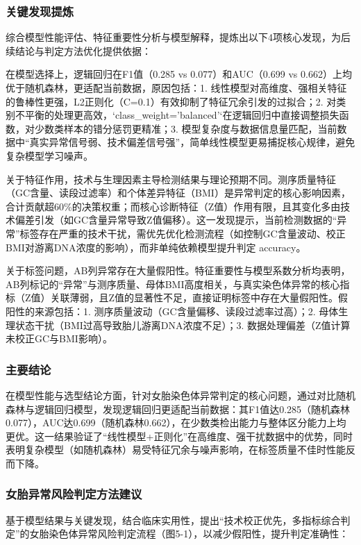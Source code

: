 \documentclass[withoutpreface,bwprint]{cumcmthesis} %
\begin{document}
\subsubsection{关键发现提炼}
综合模型性能评估、特征重要性分析与模型解释，提炼出以下4项核心发现，为后续结论与判定方法优化提供依据：

在模型选择上，逻辑回归在F1值（0.285 vs 0.077）和AUC（0.699 vs 0.662）上均优于随机森林，更适配当前数据，原因包括：1. 线性模型对高维度、强相关特征的鲁棒性更强，L2正则化（C=0.1）有效抑制了特征冗余引发的过拟合；2. 对类别不平衡的处理更高效，`class\_weight='balanced'`在逻辑回归中直接调整损失函数，对少数类样本的错分惩罚更精准；3. 模型复杂度与数据信息量匹配，当前数据中“真实异常信号弱、技术偏差信号强”，简单线性模型更易捕捉核心规律，避免复杂模型学习噪声。

关于特征作用，技术与生理因素主导检测结果与理论预期不同。测序质量特征（GC含量、读段过滤率）和个体差异特征（BMI）是异常判定的核心影响因素，合计贡献超60\%的决策权重；而核心诊断特征（Z值）作用有限，且其变化多由技术偏差引发（如GC含量异常导致Z值偏移）。这一发现提示，当前检测数据的“异常”标签存在严重的技术干扰，需优先优化检测流程（如控制GC含量波动、校正BMI对游离DNA浓度的影响），而非单纯依赖模型提升判定 accuracy。

关于标签问题，AB列异常存在大量假阳性。特征重要性与模型系数分析均表明，AB列标记的“异常”与测序质量、母体BMI高度相关，与真实染色体异常的核心指标（Z值）关联薄弱，且Z值的显著性不足，直接证明标签中存在大量假阳性。假阳性的来源包括：1. 测序质量波动（GC含量偏移、读段过滤率过高）；2. 母体生理状态干扰（BMI过高导致胎儿游离DNA浓度不足）；3. 数据处理偏差（Z值计算未校正GC与BMI影响）。

\subsubsection{主要结论}
在模型性能与选型结论方面，针对女胎染色体异常判定的核心问题，通过对比随机森林与逻辑回归模型，发现逻辑回归更适配当前数据：其F1值达0.285（随机森林0.077），AUC达0.699（随机森林0.662），在少数类检出能力与整体区分能力上均更优。这一结果验证了“线性模型+正则化”在高维度、强干扰数据中的优势，同时表明复杂模型（如随机森林）易受特征冗余与噪声影响，在标签质量不佳时性能反而下降。

\subsubsection{女胎异常风险判定方法建议}
基于模型结果与关键发现，结合临床实用性，提出“技术校正优先，多指标综合判定”的女胎染色体异常风险判定流程（图5-1），以减少假阳性，提升判定准确性：
\end{document}
